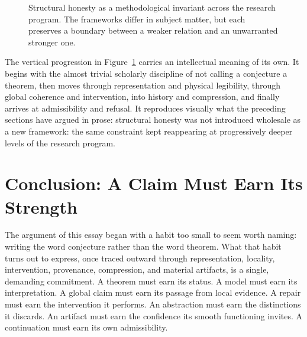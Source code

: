 \documentclass[11pt]{article}
\begin{document}
\begin{figure}[H]
{%
}
\caption{Structural honesty as a methodological invariant across the research program. The frameworks differ in subject matter, but each preserves a boundary between a weaker relation and an unwarranted stronger one.}
\label{fig:architecture}
\end{figure}

The vertical progression in Figure~\ref{fig:architecture} carries an intellectual meaning of its own. It begins with the almost trivial scholarly discipline of not calling a conjecture a theorem, then moves through representation and physical legibility, through global coherence and intervention, into history and compression, and finally arrives at admissibility and refusal. It reproduces visually what the preceding sections have argued in prose: structural honesty was not introduced wholesale as a new framework: the same constraint kept reappearing at progressively deeper levels of the research program.

\section{Conclusion: A Claim Must Earn Its Strength}

The argument of this essay began with a habit too small to seem worth naming: writing the word conjecture rather than the word theorem. What that habit turns out to express, once traced outward through representation, locality, intervention, provenance, compression, and material artifacts, is a single, demanding commitment. A theorem must earn its status. A model must earn its interpretation. A global claim must earn its passage from local evidence. A repair must earn the intervention it performs. An abstraction must earn the distinctions it discards. An artifact must earn the confidence its smooth functioning invites. A continuation must earn its own admissibility.
\end{document}
